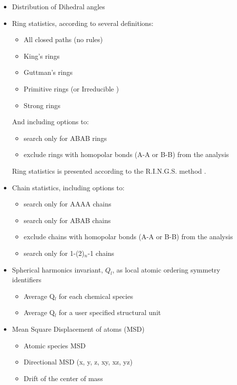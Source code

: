 {{\begin{itemize}
\item Distribution of Dihedral angles
\item Ring statistics, according to several definitions:
\begin{itemize}
\item All closed paths (no rules)
\item King's rings \cite{Nature.213.1112,PhysRevB.44.4925}
\item Guttman's rings \cite{Guttman-116-145}
\item Primitive rings \cite{Goetzke-127.215,YuanCormack-24-343} (or Irreducible \cite{Wooten-bk0109})
\item Strong rings \cite{Goetzke-127.215,YuanCormack-24-343}
\end{itemize}
And including options to:
\begin{itemize}
\item search only for ABAB rings
\item exclude rings with homopolar bonds (A-A or B-B) from the analysis
\end{itemize}
Ring statistics is presented according to the R.I.N.G.S. method \cite{RINGS}.
\item Chain statistics, including options to:
\begin{itemize}
\item search only for AAAA chains
\item search only for ABAB chains
\item exclude chains with homopolar bonds (A-A or B-B) from the analysis
\item search only for 1-(2)$_n$-1 chains
\end{itemize}
\item Spherical harmonics invariant, $Q_l$, as local atomic ordering symmetry identifiers \cite{PhysRevB.28.784}
\begin{itemize}
\item Average Q$_l$ for each chemical species
\item Average Q$_l$ for a user specified structural unit
\end{itemize}
\item Mean Square Displacement of atoms (MSD)
\begin{itemize}
\item Atomic species MSD
\item Directional MSD (x, y, z, xy, xz, yz)
\item Drift of the center of mass
\end{itemize}
\end{itemize}
}}

